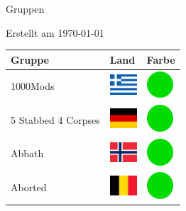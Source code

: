 \documentclass[12pt, a4paper, twoside]{report}
\begin{document}
	
	\begin{center}
		\vspace{1cm}
		{\Large Gruppen\par}
		
		{\large Erstellt am \today\par}
	\end{center}
	
	\begin{center}
		\begin{longtable}{|p{5cm}|p{2cm}|p{2cm}|} 
			
			\hline
			\rowcolor{lightgray} Gruppe & Land & Farbe \\ \hline
			\endhead
 1000Mods                                                   & \includegraphics[width=1cm]{4x3/gr} &   \includegraphics[width=1cm]{likes/y} \\ \hline
 5 Stabbed 4 Corpses                                        & \includegraphics[width=1cm]{4x3/de} &   \includegraphics[width=1cm]{likes/y} \\ \hline
 Abbath                                                     & \includegraphics[width=1cm]{4x3/no} &   \includegraphics[width=1cm]{likes/y} \\ \hline
 Aborted                                                    & \includegraphics[width=1cm]{4x3/be} &   \includegraphics[width=1cm]{likes/y} \\ \hline

\end{longtable}
\end{center}
\end{document}
